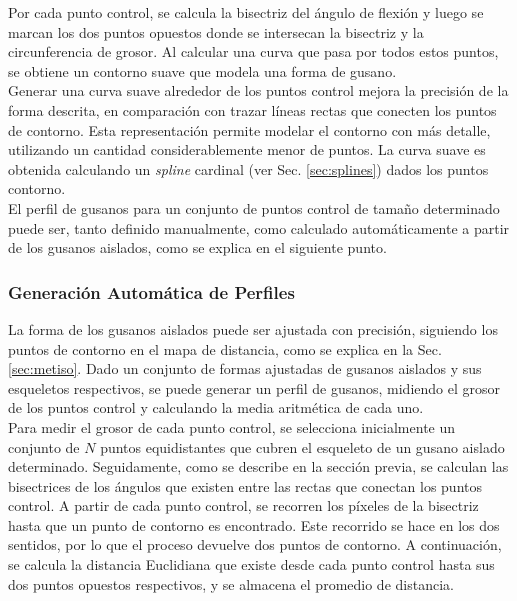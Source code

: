 Por cada punto control, se calcula la bisectriz del \'angulo de flexi\'on y luego
se marcan los dos puntos opuestos donde se intersecan la bisectriz y la circunferencia
de grosor. Al calcular una curva que pasa por todos estos puntos, se obtiene un
contorno suave que modela una forma de gusano.\\

Generar una curva suave alrededor de los puntos control mejora la precisi\'on
de la forma descrita, en comparaci\'on con trazar l\'ineas rectas que
conecten los puntos de contorno. Esta representaci\'on permite modelar el 
contorno con m\'as detalle, utilizando un cantidad considerablemente menor
de puntos. La curva suave es obtenida calculando un \emph{spline} cardinal
(ver Sec. \ref{sec:splines}) dados los puntos contorno.\\

El perfil de gusanos para un conjunto de puntos control de tama\~no determinado 
puede ser, tanto definido manualmente, como calculado autom\'aticamente a partir
de los gusanos aislados, como se explica en el siguiente punto.


\subsubsection*{Generaci\'on Autom\'atica de Perfiles}
\label{sec:metwormprof}

La forma de los gusanos aislados puede ser ajustada con precisi\'on, siguiendo
los puntos de contorno en el mapa de distancia, como se explica en la Sec. \ref{sec:metiso}.
Dado un conjunto de formas ajustadas de gusanos aislados y sus esqueletos respectivos, se 
puede generar un perfil de gusanos, midiendo el grosor de los puntos control y calculando
la media aritm\'etica de cada uno.\\

Para medir el grosor de cada punto control, se selecciona inicialmente un conjunto
de $N$ puntos equidistantes que cubren el esqueleto de un gusano aislado determinado.
Seguidamente, como se describe en la secci\'on previa, se calculan las bisectrices de los \'angulos
que existen entre las rectas que conectan los puntos control. A partir de cada punto control, 
se recorren los p\'ixeles de la bisectriz hasta que un punto de contorno es encontrado. Este
recorrido se hace en los dos sentidos, por lo que el proceso devuelve dos puntos de contorno.
A continuaci\'on, se calcula la distancia Euclidiana que existe desde cada punto control hasta
sus dos puntos opuestos respectivos, y se almacena el promedio de distancia.\\

